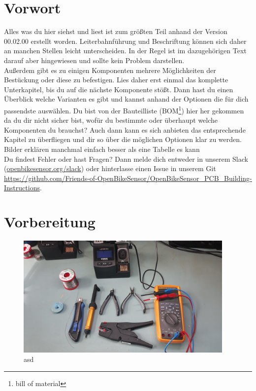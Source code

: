 \documentclass[12pt, a4paper]{article}		%
\begin{document}
\section{Vorwort}

Alles was du hier siehst und liest ist zum größten Teil anhand der Version 00.02.00 erstellt worden. Leiterbahnführung und Beschriftung können sich daher an manchen Stellen leicht unterscheiden. In der Regel ist im dazugehörigen Text darauf aber hingewiesen und sollte kein Problem darstellen.\\

Außerdem gibt es zu einigen Komponenten mehrere Möglichkeiten der Bestückung oder diese zu befestigen. Lies daher erst einmal das komplette Unterkapitel, bis du auf die nächste Komponente stößt. Dann hast du einen Überblick welche Varianten es gibt und kannst anhand der Optionen die für dich passendste auswählen. Du bist von der Bauteilliste (BOM\footnote{bill of material}) hier her gekommen da du dir nicht sicher bist, wofür du bestimmte oder überhaupt welche Komponenten du brauchst? Auch dann kann es sich anbieten das entsprechende Kapitel zu überfliegen und dir so über die möglichen Optionen klar zu werden. Bilder erklären manchmal einfach besser als eine Tabelle es kann \\
Du findest Fehler oder hast Fragen? Dann melde dich entweder in unserem Slack (\href{openbikesensor.org/slack}{openbikesensor.org/slack}) oder hinterlasse einen Issue in unserem Git \href{https://github.com/Friends-of-OpenBikeSensor/OpenBikeSensor_PCB_Building-Instructions}{https://github.com/Friends-of-OpenBikeSensor/OpenBikeSensor\_PCB\_Building-Instructions}. 



\section{Vorbereitung}

\begin{figure}[H]
	\centering
		\includegraphics[width=0.95\textwidth]{Grafiken/20200726_121811.jpg}
	\caption{asd}
	\label{fig:20200726_121811}
\end{figure}
\end{document}
